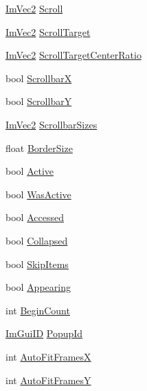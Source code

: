 \begin{DoxyCompactItemize}
\mbox{\hyperlink{struct_im_vec2}{Im\+Vec2}} \mbox{\hyperlink{struct_im_gui_window_abf20537560b9454a1e39667b8f9e7ff2}{Scroll}}
\item 
\mbox{\hyperlink{struct_im_vec2}{Im\+Vec2}} \mbox{\hyperlink{struct_im_gui_window_a77f86bed14712f73d9fb4b8ba2c4d040}{Scroll\+Target}}
\item 
\mbox{\hyperlink{struct_im_vec2}{Im\+Vec2}} \mbox{\hyperlink{struct_im_gui_window_a41f1fde48e59626ea1d19d098cd8ad84}{Scroll\+Target\+Center\+Ratio}}
\item 
bool \mbox{\hyperlink{struct_im_gui_window_a5aeada04ca67b0522677f5cdf5c6b483}{ScrollbarX}}
\item 
bool \mbox{\hyperlink{struct_im_gui_window_ae95f526590e0777de9cf26581a7d6702}{ScrollbarY}}
\item 
\mbox{\hyperlink{struct_im_vec2}{Im\+Vec2}} \mbox{\hyperlink{struct_im_gui_window_a040ebb8ac7de890df6cb6bfe048a72d5}{Scrollbar\+Sizes}}
\item 
float \mbox{\hyperlink{struct_im_gui_window_a925e24aba3aa638813057fb7e2038c14}{Border\+Size}}
\item 
bool \mbox{\hyperlink{struct_im_gui_window_a42f141fa0eed059176cb4360df1b1eb2}{Active}}
\item 
bool \mbox{\hyperlink{struct_im_gui_window_ab346ec3a2f305948af05ec1871610a8f}{Was\+Active}}
\item 
bool \mbox{\hyperlink{struct_im_gui_window_ae57daacbc89e06bca5bc335dbca3ad15}{Accessed}}
\item 
bool \mbox{\hyperlink{struct_im_gui_window_a04e6b533b2401d1c7e78b47e31538e7b}{Collapsed}}
\item 
bool \mbox{\hyperlink{struct_im_gui_window_ac620c64ec2897561f719db266f5e9b05}{Skip\+Items}}
\item 
bool \mbox{\hyperlink{struct_im_gui_window_a158ebb04d20cac09504fdbc4994eb017}{Appearing}}
\item 
int \mbox{\hyperlink{struct_im_gui_window_aa27229a425dc17303be1cd8f4a61c17f}{Begin\+Count}}
\item 
\mbox{\hyperlink{imgui_8h_a1785c9b6f4e16406764a85f32582236f}{Im\+Gui\+ID}} \mbox{\hyperlink{struct_im_gui_window_a319c5f43fa4ee9c76b8a6e551e0c0869}{Popup\+Id}}
\item 
int \mbox{\hyperlink{struct_im_gui_window_a4ec83127718940ff4e0e268dc45232cf}{Auto\+Fit\+FramesX}}
\item 
int \mbox{\hyperlink{struct_im_gui_window_a081b945f503a33c5fc686ff2ea9985f0}{Auto\+Fit\+FramesY}}
\item 

\end{DoxyCompactItemize}
